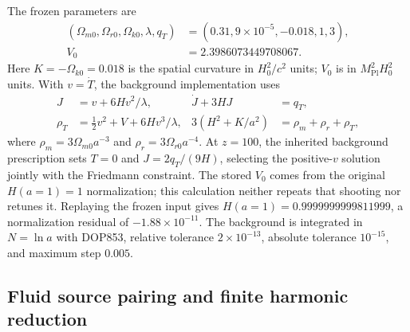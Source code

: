 The frozen parameters are
\begin{equation}
 \begin{split}
 (\Omega_{m0},\Omega_{r0},\Omega_{k0},\lambda,q_T)
 &=(0.31,9\times10^{-5},-0.018,1,3),\\
 V_0&=2.3986073449708067 .
 \end{split}
 \label{eq:app-background-parameters}
\end{equation}
Here $K=-\Omega_{k0}=0.018$ is the spatial curvature in $H_0^2/c^2$ units;
$V_0$ is in $M_{\mathrm{Pl}}^2H_0^2$ units.  With $v=\dot T$, the background
implementation uses
\begin{align}
 J&=v+6Hv^2/\lambda, & \dot J+3HJ&=q_T,\nonumber\\
 \rho_T&=\tfrac12v^2+V+6Hv^3/\lambda,
 &3(H^2+K/a^2)&=\rho_m+\rho_r+\rho_T ,
 \label{eq:app-background-equations}
\end{align}
where $\rho_m=3\Omega_{m0}a^{-3}$ and
$\rho_r=3\Omega_{r0}a^{-4}$.  At $z=100$, the inherited background
prescription sets $T=0$ and $J=2q_T/(9H)$, selecting the positive-$v$
solution jointly with the Friedmann constraint.  The stored $V_0$ comes
from the original $H(a=1)=1$ normalization; this calculation neither repeats
that shooting nor retunes it.  Replaying the frozen input gives
$H(a=1)=0.9999999999811999$, a normalization residual of
$-1.88\times10^{-11}$.
The background is integrated in $N=\ln a$ with DOP853, relative tolerance
$2\times10^{-13}$, absolute tolerance $10^{-15}$, and maximum step $0.005$.

\subsection{Fluid source pairing and finite harmonic reduction}

